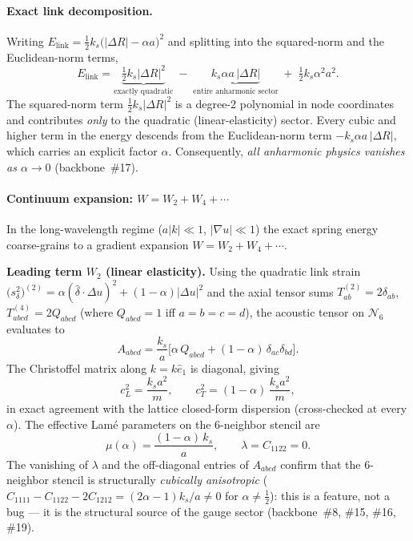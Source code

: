 \paragraph{Exact link decomposition.}
Writing $E_{\mathrm{link}} = \tfrac12 k_s\bigl(|\Delta R|-\alpha a\bigr)^2$ and splitting into the
squared-norm and the Euclidean-norm terms,
\begin{equation}
  E_{\mathrm{link}}
  = \underbrace{\tfrac12 k_s|\Delta R|^2}_{\text{exactly quadratic}}
  \;-\; \underbrace{k_s\alpha a\,|\Delta R|}_{\text{entire anharmonic sector}}
  \;+\; \tfrac12 k_s\alpha^2 a^2.
  \label{eq:link-decomp}
\end{equation}
The squared-norm term $\tfrac12 k_s|\Delta R|^2$ is a degree-2 polynomial in node coordinates and
contributes \emph{only} to the quadratic (linear-elasticity) sector.
Every cubic and higher term in the energy descends from the Euclidean-norm term
$-k_s\alpha a\,|\Delta R|$, which carries an explicit factor $\alpha$.
Consequently, \emph{all anharmonic physics vanishes as $\alpha\to 0$} (backbone~\#17).

\paragraph{Continuum expansion: $W = W_2 + W_4 + \cdots$}
In the long-wavelength regime ($a|k|\ll 1$, $|\nabla u|\ll 1$) the exact spring energy coarse-grains
to a gradient expansion $W = W_2 + W_4 + \cdots$.

\smallskip
\noindent\textbf{Leading term $W_2$ (linear elasticity).}
Using the quadratic link strain
$\bigl(s_\delta^2\bigr)^{(2)} = \alpha(\hat\delta\cdot\Delta u)^2 + (1-\alpha)|\Delta u|^2$
and the axial tensor sums $T^{(2)}_{ab}=2\delta_{ab}$, $T^{(4)}_{abcd}=2Q_{abcd}$
(where $Q_{abcd}=1$ iff $a=b=c=d$), the acoustic tensor on $\mathcal{N}_6$ evaluates to
\begin{equation}
  A_{abcd} = \frac{k_s}{a}\bigl[\alpha\,Q_{abcd} + (1-\alpha)\,\delta_{ac}\delta_{bd}\bigr].
  \label{eq:acoustic-tensor}
\end{equation}
The Christoffel matrix along $k=k\hat{e}_1$ is diagonal, giving
\begin{equation}
  c_L^2 = \frac{k_s a^2}{m},
  \qquad
  c_T^2 = (1-\alpha)\,\frac{k_s a^2}{m},
  \label{eq:wave-speeds-derived}
\end{equation}
in exact agreement with the lattice closed-form dispersion
(cross-checked at every $\alpha$).
The effective Lam\'e parameters on the 6-neighbor stencil are
\begin{equation}
  \mu(\alpha) = \frac{(1-\alpha)\,k_s}{a},
  \qquad
  \lambda = C_{1122} = 0.
  \label{eq:lame-6neighbor}
\end{equation}
The vanishing of $\lambda$ and the off-diagonal entries of $A_{abcd}$ confirm that the
6-neighbor stencil is structurally \emph{cubically anisotropic}
($C_{1111}-C_{1122}-2C_{1212}=(2\alpha-1)k_s/a\ne0$ for $\alpha\ne\tfrac12$):
this is a feature, not a bug --- it is the structural source of the gauge sector
(backbone~\#8, \#15, \#16, \#19).

